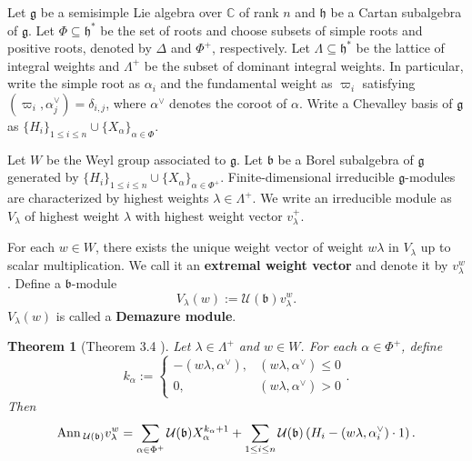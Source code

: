 \documentclass[12pt]{amsart}
\newtheorem{theorem}{Theorem}[section]
\theoremstyle{definition}
\theoremstyle{remark}
\newcommand{\C}{\mathbb{C}}
\begin{document}
Let $\mathfrak{g}$ be a semisimple Lie algebra over $\C$ of rank $n$ and $\mathfrak{h}$ be a Cartan subalgebra of $\mathfrak{g}$. Let $\Phi \subseteq \mathfrak{h}^*$ be the set of roots and choose subsets of simple roots and positive roots, denoted by $\Delta$ and $\Phi^+$, respectively. Let $\Lambda \subseteq \mathfrak{h}^*$ be the lattice of integral weights and $\Lambda^+$ be the subset of dominant integral weights. In particular, write the simple root as $\alpha_i$ and the fundamental weight as $\varpi_i$ satisfying $( \varpi_i , \alpha_j^\vee ) = \delta_{i,j}$, where $\alpha^\vee$ denotes the coroot of $\alpha$. Write a Chevalley basis of $\mathfrak{g}$ as $\{H_i\}_{1 \leq i \leq n} \cup \{X_\alpha\}_{\alpha \in \Phi}$.

Let $W$ be the Weyl group associated to $\mathfrak{g}$. Let $\mathfrak{b}$ be a Borel subalgebra of $\mathfrak{g}$ generated by $\{H_i \}_{1 \leq i \leq n} \cup \{X_\alpha \}_{\alpha \in \Phi^+}$. Finite-dimensional irreducible $\mathfrak{g}$-modules are characterized by highest weights $\lambda \in \Lambda^+$. We write an irreducible module as $V_\lambda$ of highest weight $\lambda$ with highest weight vector $v_\lambda^+$.

For each $w \in W$, there exists the unique weight vector of weight $w\lambda$ in $V_\lambda$ up to scalar multiplication. We call it an \textbf{extremal weight vector} and denote it by $v^w_\lambda$. Define a $\mathfrak{b}$-module
\begin{equation}\label{eqn3.1}
V_\lambda (w):= \mathcal{U} (\mathfrak{b} )  v_\lambda^w.
\end{equation}
$V_\lambda (w)$ is called a \textbf{Demazure module}.

\begin{theorem}[{Theorem 3.4 \cite{MR0826100}}]\label{thm3.1}
Let $\lambda \in \Lambda^+$ and $w \in W$. For each $\alpha \in \Phi^+$, define
\begin{equation}\label{eqn3.2}
k_\alpha :=
\begin{cases}
- ( w \lambda , \alpha^\vee ) , & ( w \lambda , \alpha^\vee )  \leq 0 \\
0, & ( w \lambda , \alpha^\vee )  > 0
\end{cases}
.
\end{equation}
Then
\begin{equation}\label{eqn3.3}
{\rm Ann \hspace{0.2em}}_{\mathcal{U}(\mathfrak{b})} v^w_\lambda = \sum_{\alpha \in \Phi^+} \mathcal{U}(\mathfrak{b}) X_\alpha^{k_\alpha +1} + \sum_{1 \leq i \leq n} \mathcal{U}(\mathfrak{b}) \left( H_i - ( w \lambda , \alpha_i^\vee ) \cdot 1  \right).
\end{equation}
\end{theorem}
\end{document}
